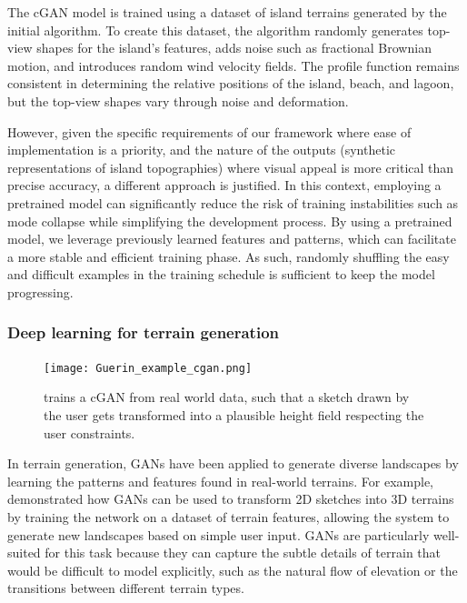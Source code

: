 The cGAN model is trained using a dataset of island terrains generated by the initial algorithm. To create this dataset, the algorithm randomly generates top-view shapes for the island's features, adds noise such as fractional Brownian motion, and introduces random wind velocity fields. The profile function remains consistent in determining the relative positions of the island, beach, and lagoon, but the top-view shapes vary through noise and deformation.


However, given the specific requirements of our framework where ease of implementation is a priority, and the nature of the outputs (synthetic representations of island topographies) where visual appeal is more critical than precise accuracy, a different approach is justified. In this context, employing a pretrained model can significantly reduce the risk of training instabilities such as mode collapse while simplifying the development process. By using a pretrained model, we leverage previously learned features and patterns, which can facilitate a more stable and efficient training phase. As such, randomly shuffling the easy and difficult examples in the training schedule is sufficient to keep the model progressing.



\subsubsection{Deep learning for terrain generation}
\label{sec:coral-island_sota-cGAN-for-terrains}

\begin{figure}[H]
    \texttt{[image: Guerin\_example\_cgan.png]}
    \caption{\cite{Guerin2017} trains a cGAN from real world data, such that a sketch drawn by the user gets transformed into a plausible height field respecting the user constraints.}
    \label{fig:coral-island_Guerin2017-example}
\end{figure}


In terrain generation, GANs have been applied to generate diverse landscapes by learning the patterns and features found in real-world terrains. For example, \citep{Guerin2017} demonstrated how GANs can be used to transform 2D sketches into 3D terrains by training the network on a dataset of terrain features, allowing the system to generate new landscapes based on simple user input. GANs are particularly well-suited for this task because they can capture the subtle details of terrain that would be difficult to model explicitly, such as the natural flow of elevation or the transitions between different terrain types.

